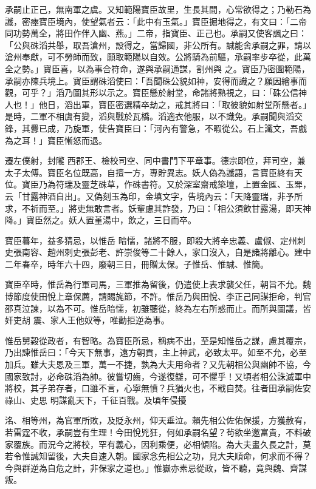 \begin{pinyinscope}
 承嗣止正己，無南軍之虞。又知範陽寶臣故里，生長其間，心常欲得之；乃勒石為讖，密瘞寶臣境內，使望氣者云：「此中有玉氣。」寶臣掘地得之，有文曰：「二帝同功勢萬全，將田作伴入幽、燕。」二帝，指寶臣、正己也。承嗣又使客諷之曰：「公與硃滔共舉，取吾滄州，設得之，當歸國，非公所有。誠能舍承嗣之罪，請以滄州奉獻，可不勞師而致，願取範陽以自效。公將騎為前驅，承嗣率步卒從，此萬全之勢。」寶臣喜，以為事合符命，遂與承嗣通謀，割州與
 之。寶臣乃密圖範陽，承嗣亦陳兵境上。寶臣謂硃滔使曰：「吾聞硃公貌如神，安得而識之？願因繪事而觀，可乎？」滔乃圖其形以示之。寶臣懸於射堂，命諸將熟視之，曰：「硃公信神人也！」他日，滔出軍，寶臣密選精卒劫之，戒其將曰：「取彼貌如射堂所懸者。」是時，二軍不相虞有變，滔與戰於瓦橋。滔適衣他服，以不識免。承嗣聞與滔交鋒，其釁已成，乃旋軍，使告寶臣曰：「河內有警急，不暇從公。石上讖文，吾戲為之耳！」寶臣慚怒而退。



 遷左僕射，封隴
 西郡王、檢校司空、同中書門下平章事。德宗即位，拜司空，兼太子太傅。寶臣名位既高，自擅一方，專貯異志。妖人偽為讖語，言寶臣終有天位。寶臣乃為符瑞及靈芝硃草，作硃書符。又於深室齋戒築壇，上置金匜、玉斝，云「甘露神酒自出」。又偽刻玉為印，金填文字，告境內云：「天降靈瑞，非予所求，不祈而至。」將吏無敢言者。妖輩慮其詐發，乃曰：「相公須飲甘露湯，即天神降。」寶臣然之。妖人置堇湯中，飲之，三日而卒。



 寶臣暮年，益多猜忌，以惟岳
 暗懦，諸將不服，即殺大將辛忠義、盧俶、定州刺史張南容、趙州刺史張彭老、許崇俊等二十餘人，家口沒入，自是諸將離心。建中二年春卒，時年六十四，廢朝三日，冊贈太保。子惟岳、惟誠、惟簡。



 寶臣卒時，惟岳為行軍司馬，三軍推為留後，仍遣使上表求襲父任，朝旨不允。魏博節度使田悅上章保薦，請賜旄節，不許。惟岳乃與田悅、李正己同謀拒命，判官邵真泣諫，以為不可。惟岳暗懦，初雖聽從，終為左右所惑而止。而所與圖議，皆奸吏胡
 震、家人王他奴等，唯勸拒逆為事。



 惟岳舅穀從政者，有智略。為寶臣所忌，稱病不出，至是知惟岳之謀，慮其覆宗，乃出諫惟岳曰：「今天下無事，遠方朝貢，主上神武，必致太平。如至不允，必至加兵。雖大夫恩及三軍，萬一不捷，孰為大夫用命者？又先朝相公與幽帥不協，今國家致討，必命硃滔為帥。彼嘗切齒，今遂復讎，可不懼乎！又頃者相公誅滅軍中將校，其子弟存者，口雖不言，心寧無憤？兵猶火也，不戢自焚。往者田承嗣佐安祿山、史思
 明謀亂天下，千征百戰。及頃年侵擾



 洺、相等州，為官軍所敗，及貶永州，仰天垂泣。賴先相公佐佑保援，方獲赦宥，若雷霆不收，承嗣豈有生理！今田悅兇狂，何如承嗣名望？茍欲坐邀富貴，不料破家覆族。而況今之將校，罕有義心，因利乘便，必相傾陷。為大夫畫久長之計，莫若令惟誠知留後，大夫自速入朝。國家念先相公之功，見大夫順命，何求而不得？今與群逆為自危之計，非保家之道也。」惟嶽亦素忌從政，皆不聽，竟與魏、齊謀叛。




\end{pinyinscope}
